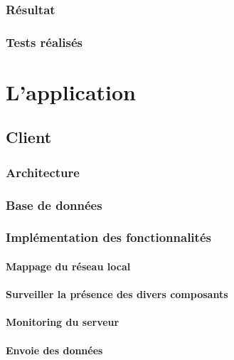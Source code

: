 \subsection{Résultat}
\subsection{Tests réalisés}

\chapter{L'application}



\section{Client}

\subsection{Architecture}
\subsection{Base de données}

\subsection{Implémentation des fonctionnalités}
\subsubsection{Mappage du réseau local}


\subsubsection{Surveiller la présence des divers composants}

\subsubsection{Monitoring du serveur}

\subsubsection{Envoie des données}



